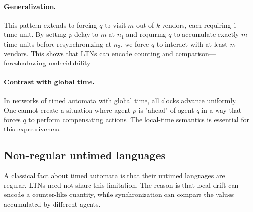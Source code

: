 \paragraph{Generalization.} This pattern extends to forcing $q$ to visit $m$ out of $k$ vendors, each requiring $1$ time unit. By setting $p$ delay to $m$ at $n_1$ and requiring $q$ to accumulate exactly $m$ time units before resynchronizing at $n_3$, we force $q$ to interact with at least $m$ vendors. This shows that LTNs can encode counting and comparison—foreshadowing undecidability.

\paragraph{Contrast with global time.} In networks of timed automata with global time, all clocks advance uniformly. One cannot create a situation where agent $p$ is "ahead" of agent $q$ in a way that forces $q$ to perform compensating actions. The local-time semantics is essential for this expressiveness.


\subsection{Non-regular untimed languages}
\label{subsec:ltn-nonregular}

A classical fact about timed automata is that their untimed languages are
regular.  LTNs need not share this limitation.  The reason is that local drift
can encode a counter-like quantity, while synchronization can compare the values
accumulated by different agents.

